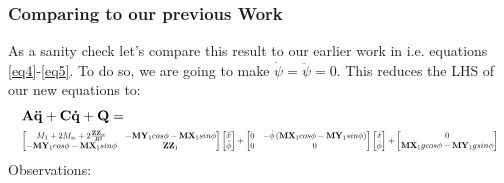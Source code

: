 \documentclass[a4paper,10pt]{article}
\newcommand\scalemath[2]{\scalebox{#1}{\mbox{\ensuremath{\displaystyle #2}}}}
\begin{document}
\subsubsection{Comparing to our previous Work \cite{munzir2013balancing}}
As a sanity check let's compare this result to our earlier work in \cite{munzir2013balancing} i.e. equations \ref{eq4}-\ref{eq5}.
To do so, we are going to make $\dot\psi = \ddot\psi = 0$. This reduces the LHS of our new equations to:
\begin{align} \begin{split}
 &\mathbf{A\ddot{q}+C\dot{q}+Q} = \\ &\scalemath{0.6}{\left[ \begin{matrix} M_1+2M_w+2\frac{\mathbf{ZZ}_w}{R^2} & -\mathbf{MY}_1cos\phi-\mathbf{MX}_1sin\phi \\ 
   -\mathbf{MY}_1cos\phi-\mathbf{MX}_1sin\phi  & \mathbf{ZZ}_1 \end{matrix} \right] \left[\begin{matrix} \ddot{x} \\ \ddot{\phi} \end{matrix} \right]
   + \left[ \begin{matrix} 0 & -\dot{\phi}\left(\mathbf{MX}_1cos\phi-\mathbf{MY}_1sin\phi\right) \\ 0 & 0 \end{matrix} \right] \left[\begin{matrix} \dot{x} \\ \dot{\phi} \end{matrix} \right]
   + \left[ \begin{matrix} 0 \\ \mathbf{MX}_1gcos\phi - \mathbf{MY}_1gsin\phi \end{matrix} \right]} \label{eq:2dim}
\end{split} \end{align}
Observations:
\end{document}
